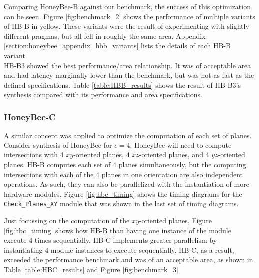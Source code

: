         Comparing HoneyBee-B against our benchmark, the success of this optimization can be seen. Figure \ref{fig:benchmark_2} shows the performance of multiple variants of \gls{HB-B} in yellow. These variants were the result of experimenting with slightly different \glspl{pragma}, but all fell in roughly the same area. Appendix \ref{section:honeybee_appendix_hbb_variants} lists the details of each \gls{HB-B} variant. \\
        HB-B3 showed the best performance/area relationship. It was of acceptable area and had latency marginally lower than the benchmark, but was not as fast as the defined specifications. Table \ref{table:HBB_results} shows the result of HB-B3's synthesis compared with its performance and area specifications.

        

        

    \subsubsection{HoneyBee-C}
        A similar concept was applied to optimize the computation of each set of planes. Consider synthesis of HoneyBee for $\epsilon = 4$. HoneyBee will need to compute intersections with 4 $xy$-oriented planes, 4 $xz$-oriented planes, and 4 $yz$-oriented planes. \gls{HB-B} computes each set of 4 planes simultaneously, but the computing intersections with each of the 4 planes in one orientation are also independent operations. As such, they can also be parallelized with the instantiation of more hardware modules. Figure \ref{fig:hbc_timing} shows the timing diagrams for the \texttt{Check\_Planes\_XY} module that was shown in the last set of timing diagrams.

        

        Just focussing on the computation of the $xy$-oriented planes, Figure \ref{fig:hbc_timing} shows how \gls{HB-B} than having one instance of the module execute 4 times sequentially. \gls{HB-C} implements greater parallelism by instantiating 4 module instances to execute sequentially. \gls{HB-C}, as a result, exceeded the performance benchmark and was of an acceptable area, as shown in Table \ref{table:HBC_results} and Figure \ref{fig:benchmark_3}

        

        